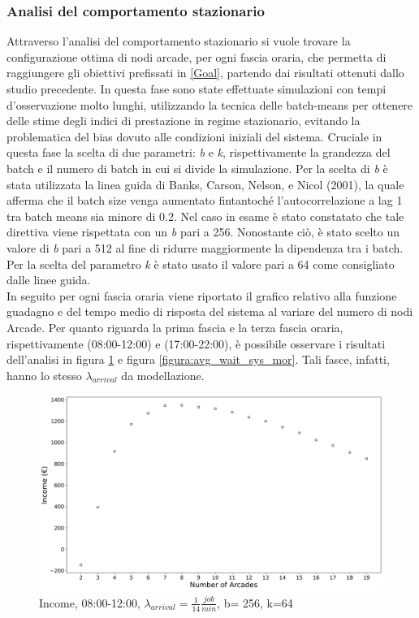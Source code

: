 \documentclass{article}
\begin{document}
\subsubsection{Analisi del comportamento stazionario}
Attraverso l'analisi del comportamento stazionario si vuole trovare la configurazione ottima di nodi arcade, per ogni fascia oraria, che permetta di raggiungere gli obiettivi prefissati in \ref{Goal}, partendo dai risultati ottenuti dallo studio precedente.
In questa fase sono state effettuate simulazioni con tempi
d’osservazione molto lunghi, utilizzando la tecnica delle batch-means per ottenere delle stime degli indici di prestazione in regime stazionario, evitando la problematica del bias dovuto alle condizioni iniziali del sistema. Cruciale in questa fase la scelta di due parametri: \textit{b} e \textit{k}, rispettivamente la grandezza del batch e il numero di batch in cui si divide la simulazione. Per la scelta di \textit{b} è stata utilizzata la linea guida di Banks, Carson, Nelson, e Nicol (2001), la quale afferma che il batch size venga aumentato fintantoché l'autocorrelazione a lag 1 tra batch means sia minore di 0.2. Nel caso in esame è stato constatato che tale direttiva viene rispettata con un \textit{b} pari a 256. Nonostante ciò, è stato scelto un valore di \textit{b} pari a 512 al fine di ridurre maggiormente la dipendenza tra i batch.
Per la scelta del parametro \textit{k} è stato usato il valore pari a 64 come consigliato dalle linee guida.
\\
In seguito per ogni fascia oraria viene riportato il grafico relativo alla funzione guadagno e del tempo medio di risposta del sistema al variare del numero di nodi Arcade.
Per quanto riguarda la prima fascia e la terza fascia oraria, rispettivamente (08:00-12:00) e (17:00-22:00), è possibile osservare i risultati dell'analisi in figura \ref{figura:income_mor} e figura \ref{figura:avg_wait_sys_mor}. Tali fasce, infatti, hanno lo stesso $\lambda_{arrival}$ da modellazione.
\begin{figure}[H]
	\centering
	\captionsetup{justification=centering,margin=2cm}
	\includegraphics[scale=0.48]{images/income_mor.png}
	\caption{Income, 08:00-12:00, $\lambda_{arrival}=\frac{1}{14} \frac{job}{min}$, b= 256, k=64}\label{figura:income_mor}
\end{figure}
\end{document}
